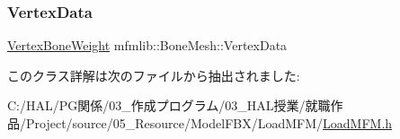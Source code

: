 \mbox{\label{classmfmlib_1_1_bone_mesh_ab252d2d15dc2e927471943a33b19fbc4}} 
\subsubsection{\texorpdfstring{Vertex\+Data}{VertexData}}
{\footnotesize\ttfamily \mbox{\hyperlink{classmfmlib_1_1_vertex_bone_weight}{Vertex\+Bone\+Weight}} mfmlib\+::\+Bone\+Mesh\+::\+Vertex\+Data}



このクラス詳解は次のファイルから抽出されました\+:\begin{DoxyCompactItemize}
\item 
C\+:/\+H\+A\+L/\+P\+G関係/03\+\_\+作成プログラム/03\+\_\+\+H\+A\+L授業/就職作品/\+Project/source/05\+\_\+\+Resource/\+Model\+F\+B\+X/\+Load\+M\+F\+M/\mbox{\hyperlink{_load_m_f_m_8h}{Load\+M\+F\+M.\+h}}\end{DoxyCompactItemize}
